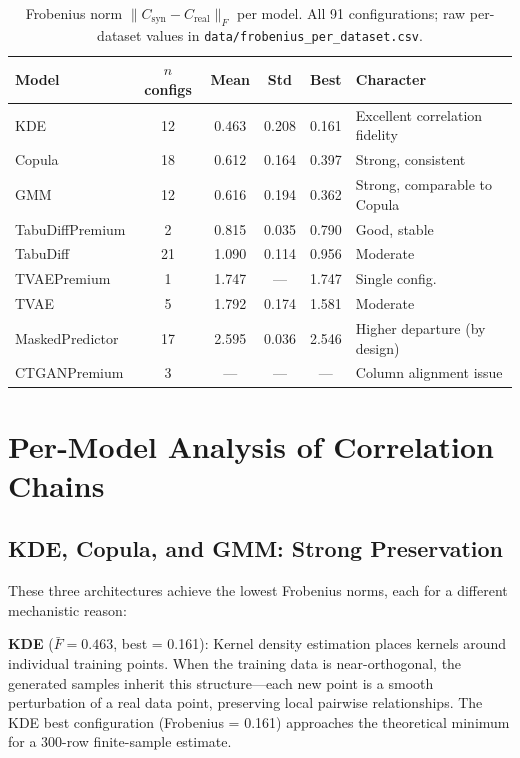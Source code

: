 \documentclass[11pt, a4paper]{report}
\begin{document}
\begin{table}[H]
\centering
\caption{Frobenius norm $\lVert C_{\text{syn}} - C_{\text{real}} \rVert_F$ per model. All 91 configurations; raw per-dataset values in \texttt{data/frobenius\_per\_dataset.csv}.}
\label{tab:frobenius}
\begin{tabular}{lccccl}
\toprule
\textbf{Model} & \textbf{$n$ configs} & \textbf{Mean} & \textbf{Std} & \textbf{Best} & \textbf{Character} \\
\midrule
\rowcolor{teal!12}
KDE              & 12 & 0.463 & 0.208 & 0.161 & Excellent correlation fidelity \\
\rowcolor{teal!7}
Copula           & 18 & 0.612 & 0.164 & 0.397 & Strong, consistent \\
\rowcolor{teal!7}
GMM              & 12 & 0.616 & 0.194 & 0.362 & Strong, comparable to Copula \\
TabuDiffPremium  &  2 & 0.815 & 0.035 & 0.790 & Good, stable \\
TabuDiff         & 21 & 1.090 & 0.114 & 0.956 & Moderate \\
TVAEPremium      &  1 & 1.747 & ---   & 1.747 & Single config. \\
TVAE             &  5 & 1.792 & 0.174 & 1.581 & Moderate \\
MaskedPredictor  & 17 & 2.595 & 0.036 & 2.546 & Higher departure (by design) \\
CTGANPremium     &  3 & ---   & ---   & ---   & Column alignment issue \\
\bottomrule
\end{tabular}
\end{table}

\section{Per-Model Analysis of Correlation Chains}

\subsection{KDE, Copula, and GMM: Strong Preservation}

These three architectures achieve the lowest Frobenius norms, each for a different mechanistic reason:

\textbf{KDE} ($\bar{F} = 0.463$, best = 0.161): Kernel density estimation places kernels around individual training points. When the training data is near-orthogonal, the generated samples inherit this structure---each new point is a smooth perturbation of a real data point, preserving local pairwise relationships. The KDE best configuration (Frobenius = 0.161) approaches the theoretical minimum for a 300-row finite-sample estimate.
\end{document}
